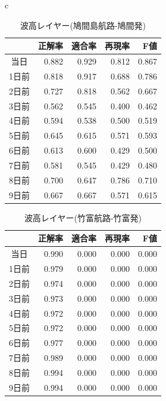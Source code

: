 \begin{table}[htbp]
\begin{center}
\begin{tabular}{c}
\begin{minipage}{0.5\hsize}
\begin{center}
          \caption{波高レイヤー(鳩間島航路-鳩間発)}
    \begin{tabular}{|c|r|r|r|r|} \hline
   &正解率 & 適合率 & 再現率 & F値 \\ \hline
      当日 & 0.882 & 0.929 & 0.812 & 0.867 \\ \hline
     1日前 & 0.818 & 0.917 & 0.688 & 0.786 \\ \hline
      2日前 & 0.727 & 0.818 & 0.562 & 0.667 \\ \hline
      3日前 & 0.562 & 0.545 & 0.400 & 0.462 \\ \hline 
      4日前 & 0.594 & 0.538 & 0.500 & 0.519 \\ \hline 
      5日前 & 0.645 & 0.615 & 0.571 & 0.593 \\ \hline 
      6日前 & 0.613 & 0.600 & 0.429 & 0.500 \\ \hline 
      7日前 & 0.581 & 0.545 & 0.429 & 0.480 \\ \hline 
      8日前 & 0.700 & 0.647 & 0.786 & 0.710 \\ \hline 
      9日前 & 0.667 & 0.667 & 0.571 & 0.615 \\ \hline 
          \end{tabular}
          \label{img_wave_hatoma}
        \end{center}
      \end{minipage}

    \end{tabular}
  \end{center}
\end{table}

\begin{table}[H]
  \begin{center}
    \caption{波高レイヤー(竹富航路-竹富発)}
    \begin{tabular}{|c|r|r|r|r|} \hline
   &正解率 & 適合率 & 再現率 & F値 \\ \hline
      当日 & 0.990 & 0.000 & 0.000 & 0.000 \\ \hline
     1日前 & 0.979 & 0.000 & 0.000 & 0.000 \\ \hline
      2日前 & 0.974 & 0.000 & 0.000 & 0.000 \\ \hline
      3日前 & 0.973 & 0.000 & 0.000 & 0.000 \\ \hline 
      4日前 & 0.972 & 0.000 & 0.000 & 0.000 \\ \hline 
      5日前 & 0.972 & 0.000 & 0.000 & 0.000 \\ \hline 
      6日前 & 0.977 & 0.000 & 0.000 & 0.000 \\ \hline 
      7日前 & 0.989 & 0.000 & 0.000 & 0.000 \\ \hline 
      8日前 & 0.994 & 0.000 & 0.000 & 0.000 \\ \hline 
      9日前 & 0.994 & 0.000 & 0.000 & 0.000 \\ \hline 
    \end{tabular}    
    \label{img_wave_taketomi}
  \end{center}
\end{table}


